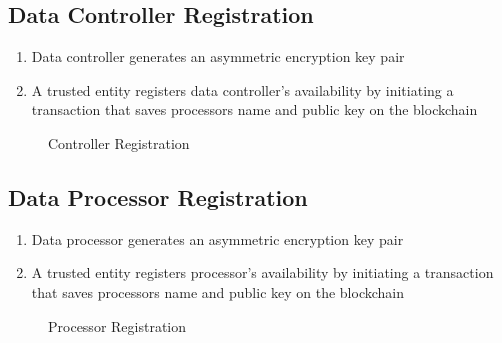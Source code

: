 \subsection{Data Controller Registration}
\label{solution:flow:con_reg}

\begin{enumerate}
  \item Data controller generates an asymmetric encryption key pair
  \item A trusted entity registers data controller's availability by initiating a transaction that saves processors name and public key on the blockchain
\end{enumerate}

\begin{figure}[ht!]
  \caption{Controller Registration}
  \label{fig:arch:con_reg}
\end{figure}

\subsection{Data Processor Registration}
\label{solution:flow:pr_reg}

\begin{enumerate}
  \item Data processor generates an asymmetric encryption key pair
  \item A trusted entity registers processor's availability by initiating a transaction that saves processors name and public key on the blockchain
\end{enumerate}

\begin{figure}[ht!]
  \caption{Processor Registration}
  \label{fig:arch:pr_reg}
\end{figure}

